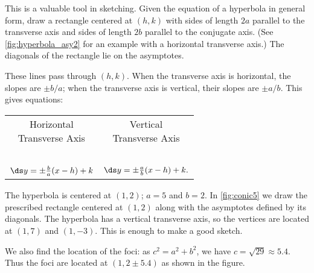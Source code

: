 This is a valuable tool in sketching. Given the equation of a hyperbola in general form, draw a rectangle centered at $(h,k)$ with sides of length $2a$ parallel to the transverse axis and sides of length $2b$ parallel to the conjugate axis. (See \autoref{fig:hyperbola_asy2} for an example with a horizontal transverse axis.) The diagonals of the rectangle lie on the asymptotes. 

These lines pass through $(h,k)$.  When the transverse axis is horizontal, the slopes are $\pm b/a$; when the transverse axis is vertical, their slopes are $\pm a/b$. This gives equations:
\begin{center}
\begin{tabular}{cc}
\parbox{100pt}{\centering Horizontal \\ Transverse Axis} & \parbox{100pt}{\centering Vertical \\ Transverse Axis} \\ \ \\
$\ds y=\pm\frac ba(x-h)+k$  &$\ds  y=\pm\frac ab(x-h)+k.$
\end{tabular}
\end{center}


{The hyperbola is centered at $(1,2)$; $a=5$ and $b=2$.
In \autoref{fig:conic5} we draw the prescribed rectangle centered at $(1,2)$ along with the asymptotes defined by its diagonals. The hyperbola has a vertical transverse axis, so the vertices are located at $(1,7)$ and $(1,-3)$. This is enough to make a good sketch.

We also find the location of the foci: as $c^2= a^2+b^2$, we have $c=\sqrt{29}\approx 5.4$. Thus the foci are located at $(1,2\pm 5.4)$ as shown in the figure.}

